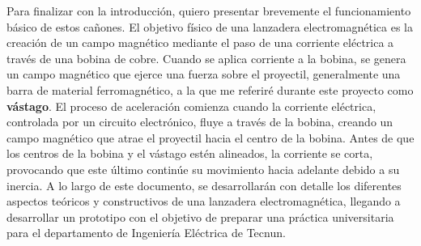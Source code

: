 Para finalizar con la introducción, quiero presentar brevemente el funcionamiento básico de estos cañones. El objetivo físico de una lanzadera electromagnética es la creación de un campo magnético mediante el paso de una corriente eléctrica a través de una bobina de cobre. Cuando se aplica corriente a la bobina, se genera un campo magnético que ejerce una fuerza sobre el proyectil, generalmente una barra de material ferromagnético, a la que me referiré durante este proyecto como \textbf{vástago}. El proceso de aceleración comienza cuando la corriente eléctrica, controlada por un circuito electrónico, fluye a través de la bobina, creando un campo magnético que atrae el proyectil hacia el centro de la bobina. Antes de que los centros de la bobina y el vástago estén alineados, la corriente se corta, provocando que este último continúe su movimiento hacia adelante debido a su inercia. A lo largo de este documento, se desarrollarán con detalle los diferentes aspectos teóricos y constructivos de una lanzadera electromagnética, llegando a desarrollar un prototipo con el objetivo de preparar una práctica universitaria para el departamento de Ingeniería Eléctrica de Tecnun.
